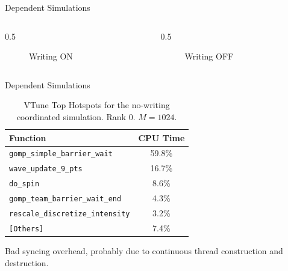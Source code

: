 \documentclass[11pt,aspectratio=169]{beamer}
\begin{document}
\begin{frame}{Dependent Simulations}
  \begin{columns}
    \begin{column}{0.5\textwidth}
      \begin{figure}
        \centering
        \scalebox{0.7}{}
        \caption{Writing ON}

      \end{figure}

    \end{column}

    \begin{column}{0.5\textwidth}
      \begin{figure}
        \centering
        \scalebox{0.7}{}
        \caption{Writing OFF}

      \end{figure}

    \end{column}
  \end{columns}

\end{frame}

\begin{frame}{Dependent Simulations}
  \begin{table}[h]
    \centering
    \small
    \begin{tabular}{lc}
      \toprule
      Function & CPU Time \\
      \midrule
      \texttt{gomp\_simple\_barrier\_wait} & 59.8\% \\
      \texttt{wave\_update\_9\_pts} & 16.7\% \\
      \texttt{do\_spin} & 8.6\% \\
      \texttt{gomp\_team\_barrier\_wait\_end} & 4.3\% \\
      \texttt{rescale\_discretize\_intensity} & 3.2\% \\
      \texttt{[Others]} & 7.4\% \\
      \bottomrule
    \end{tabular}
    \caption{VTune Top Hotspots for the
    no-writing coordinated simulation. Rank 0. $M = 1024$.}
    \label{tab:vtune_hotspots_coordinated}
  \end{table}

  Bad syncing overhead, probably due to continuous thread
  construction and destruction.
\end{frame}
\end{document}
